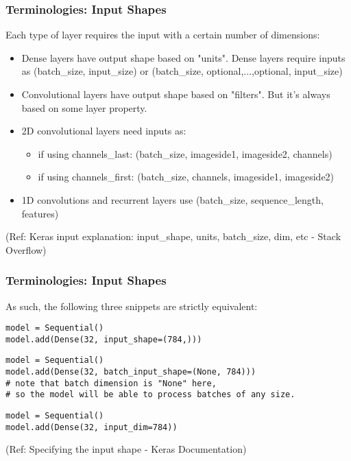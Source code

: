 \begin{frame}[fragile] \frametitle{Terminologies: Input Shapes}

Each type of layer requires the input with a certain number of dimensions:

\begin{itemize}
\item Dense layers have output shape based on "units". Dense layers require inputs as (batch\_size, input\_size) or (batch\_size, optional,...,optional, input\_size)
\item Convolutional layers have output shape based on "filters". But it's always based on some layer property. 
\item 2D convolutional layers need inputs as:
\begin{itemize}
\item if using channels\_last: (batch\_size, imageside1, imageside2, channels)
\item if using channels\_first: (batch\_size, channels, imageside1, imageside2)
\end{itemize}
\item 1D convolutions and recurrent layers use (batch\_size, sequence\_length, features)
\end{itemize}

\tiny{(Ref: Keras input explanation: input\_shape, units, batch\_size, dim, etc - Stack Overflow)}
\end{frame}

\begin{frame}[fragile] \frametitle{Terminologies: Input Shapes}

As such, the following three snippets are strictly equivalent:

\begin{lstlisting}
model = Sequential()
model.add(Dense(32, input_shape=(784,)))
\end{lstlisting}

\begin{lstlisting}
model = Sequential()
model.add(Dense(32, batch_input_shape=(None, 784)))
# note that batch dimension is "None" here,
# so the model will be able to process batches of any size.
\end{lstlisting}

\begin{lstlisting}
model = Sequential()
model.add(Dense(32, input_dim=784))
\end{lstlisting}

\tiny{(Ref: Specifying the input shape - Keras Documentation)}
\end{frame}



